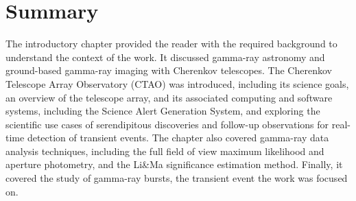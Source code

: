 \section{Summary}
The introductory chapter provided the reader with the required background to understand the context of the work. It discussed gamma-ray astronomy and ground-based gamma-ray imaging with Cherenkov telescopes. The Cherenkov Telescope Array Observatory (CTAO) was introduced, including its science goals, an overview of the telescope array, and its associated computing and software systems, including the Science Alert Generation System, and exploring the scientific use cases of serendipitous discoveries and follow-up observations for real-time detection of transient events. The chapter also covered gamma-ray data analysis techniques, including the full field of view maximum likelihood and aperture photometry, and the Li&Ma significance estimation method. Finally, it covered the study of gamma-ray bursts, the transient event the work was focused on.